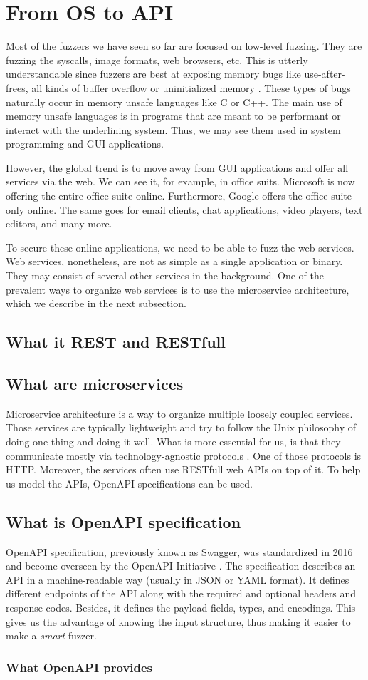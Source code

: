 \chapter{From OS to API}
Most of the fuzzers we have seen so far are focused on low-level fuzzing. They are fuzzing the syscalls, image formats, web browsers, etc. This is utterly understandable since fuzzers are best at exposing memory bugs like use-after-frees, all kinds of buffer overflow or uninitialized memory \cite{chang2017oss}. These types of bugs naturally occur in memory unsafe languages like C or C++. The main use of memory unsafe languages is in programs that are meant to be performant or interact with the underlining system. Thus, we may see them used in system programming and GUI applications.

However, the global trend is to move away from GUI applications and offer all services via the web. We can see it, for example, in office suits. Microsoft is now offering the entire office suite online. Furthermore, Google offers the office suite only online. The same goes for email clients, chat applications, video players, text editors, and many more.

To secure these online applications, we need to be able to fuzz the web services. Web services, nonetheless, are not as simple as a single application or binary. They may consist of several other services in the background. One of the prevalent ways to organize web services is to use the microservice architecture, which we describe in the next subsection.

\section{What it REST and RESTfull}

\section{What are microservices}
Microservice architecture is a way to organize multiple loosely coupled services. Those services are typically lightweight and try to follow the Unix philosophy of doing one thing and doing it well. What is more essential for us, is that they communicate mostly via technology-agnostic protocols \cite{nadareishvili2016microservice}. One of those protocols is HTTP. Moreover, the services often use RESTfull web APIs on top of it. To help us model the APIs, OpenAPI specifications can be used.

\section{What is OpenAPI specification}
OpenAPI specification, previously known as Swagger, was standardized in 2016 and become overseen by the OpenAPI Initiative \cite{openapi2020main}. The specification describes an API in a machine-readable way (usually in JSON or YAML format). It defines different endpoints of the API along with the required and optional headers and response codes. Besides, it defines the payload fields, types, and encodings. This gives us the advantage of knowing the input structure, thus making it easier to make a \emph{smart} fuzzer.

\subsection{What OpenAPI provides}
